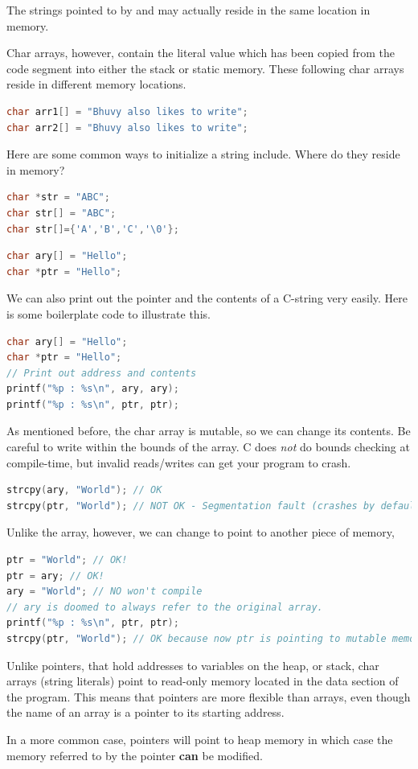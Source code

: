 The strings pointed to by  and  may actually reside in the same location in memory.

Char arrays, however, contain the literal value which has been copied from the code segment into either the stack or static memory.
These following char arrays reside in different memory locations.

\begin{lstlisting}[language=C]
char arr1[] = "Bhuvy also likes to write";
char arr2[] = "Bhuvy also likes to write";
\end{lstlisting}

Here are some common ways to initialize a string include. Where do they reside in memory?

\begin{lstlisting}[language=C]
char *str = "ABC";
char str[] = "ABC";
char str[]={'A','B','C','\0'};
\end{lstlisting}

\begin{lstlisting}[language=C]
char ary[] = "Hello";
char *ptr = "Hello";
\end{lstlisting}

We can also print out the pointer and the contents of a C-string very easily. Here is some boilerplate code to illustrate this.

\begin{lstlisting}[language=C]
char ary[] = "Hello";
char *ptr = "Hello";
// Print out address and contents
printf("%p : %s\n", ary, ary);
printf("%p : %s\n", ptr, ptr);
\end{lstlisting}

As mentioned before, the char array is mutable, so we can change its contents.
Be careful to write within the bounds of the array.
C does \emph{not} do bounds checking at compile-time, but invalid reads/writes can get your program to crash.

\begin{lstlisting}[language=C]
strcpy(ary, "World"); // OK
strcpy(ptr, "World"); // NOT OK - Segmentation fault (crashes by default; unless SIGSEGV is blocked)
\end{lstlisting}

Unlike the array, however, we can change  to point to another piece of memory,

\begin{lstlisting}[language=C]
ptr = "World"; // OK!
ptr = ary; // OK!
ary = "World"; // NO won't compile
// ary is doomed to always refer to the original array.
printf("%p : %s\n", ptr, ptr);
strcpy(ptr, "World"); // OK because now ptr is pointing to mutable memory (the array)
\end{lstlisting}

Unlike pointers, that hold addresses to variables on the heap, or stack, char arrays (string literals) point to read-only memory located in the data section of the program. This means that pointers are more flexible than arrays, even though the name of an array is a pointer to its starting address.

In a more common case, pointers will point to heap memory in which case the memory referred to by the pointer \textbf{can} be modified.


